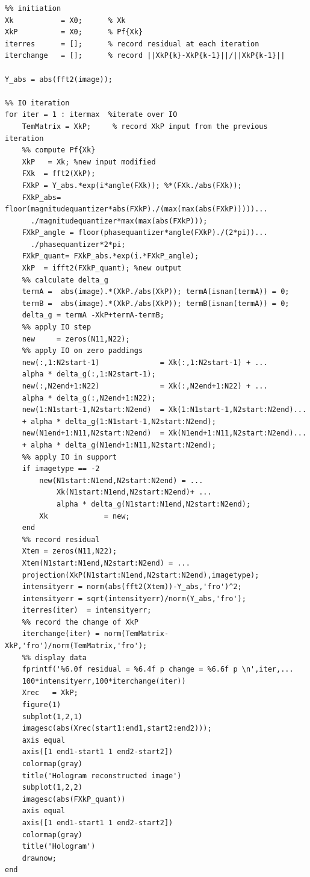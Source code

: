 \documentclass[letter,14pt]{extreport}
\begin{document}
\begin{appendices}
\begin{lstlisting}
%% initiation
Xk           = X0;      % Xk
XkP          = X0;      % Pf{Xk}
iterres      = [];      % record residual at each iteration
iterchange   = [];      % record ||XkP{k}-XkP{k-1}||/||XkP{k-1}||

Y_abs = abs(fft2(image));

%% IO iteration
for iter = 1 : itermax  %iterate over IO
    TemMatrix = XkP;     % record XkP input from the previous iteration
    %% compute Pf{Xk}
    XkP   = Xk; %new input modified
    FXk  = fft2(XkP);
    FXkP = Y_abs.*exp(i*angle(FXk)); %*(FXk./abs(FXk));
    FXkP_abs= floor(magnitudequantizer*abs(FXkP)./(max(max(abs(FXkP)))))...
      ./magnitudequantizer*max(max(abs(FXkP)));
    FXkP_angle = floor(phasequantizer*angle(FXkP)./(2*pi))...
      ./phasequantizer*2*pi;
    FXkP_quant= FXkP_abs.*exp(i.*FXkP_angle);
    XkP  = ifft2(FXkP_quant); %new output
    %% calculate delta_g
    termA =  abs(image).*(XkP./abs(XkP)); termA(isnan(termA)) = 0;
    termB =  abs(image).*(XkP./abs(XkP)); termB(isnan(termA)) = 0;
    delta_g = termA -XkP+termA-termB;
    %% apply IO step
    new     = zeros(N11,N22);
    %% apply IO on zero paddings
    new(:,1:N2start-1)              = Xk(:,1:N2start-1) + ...
    alpha * delta_g(:,1:N2start-1);
    new(:,N2end+1:N22)              = Xk(:,N2end+1:N22) + ...
    alpha * delta_g(:,N2end+1:N22);
    new(1:N1start-1,N2start:N2end)  = Xk(1:N1start-1,N2start:N2end)...
    + alpha * delta_g(1:N1start-1,N2start:N2end);
    new(N1end+1:N11,N2start:N2end)  = Xk(N1end+1:N11,N2start:N2end)...
    + alpha * delta_g(N1end+1:N11,N2start:N2end);
    %% apply IO in support
    if imagetype == -2
        new(N1start:N1end,N2start:N2end) = ...
            Xk(N1start:N1end,N2start:N2end)+ ...
            alpha * delta_g(N1start:N1end,N2start:N2end);
        Xk             = new;
    end
    %% record residual
    Xtem = zeros(N11,N22);
    Xtem(N1start:N1end,N2start:N2end) = ...
    projection(XkP(N1start:N1end,N2start:N2end),imagetype);
    intensityerr = norm(abs(fft2(Xtem))-Y_abs,'fro')^2;
    intensityerr = sqrt(intensityerr)/norm(Y_abs,'fro');
    iterres(iter)  = intensityerr;
    %% record the change of XkP
    iterchange(iter) = norm(TemMatrix-XkP,'fro')/norm(TemMatrix,'fro');
    %% display data
    fprintf('%6.0f residual = %6.4f p change = %6.6f p \n',iter,...
    100*intensityerr,100*iterchange(iter))
    Xrec   = XkP;
    figure(1)
    subplot(1,2,1)
    imagesc(abs(Xrec(start1:end1,start2:end2)));
    axis equal
    axis([1 end1-start1 1 end2-start2])
    colormap(gray)
    title('Hologram reconstructed image')
    subplot(1,2,2)
    imagesc(abs(FXkP_quant))
    axis equal
    axis([1 end1-start1 1 end2-start2])
    colormap(gray)
    title('Hologram')
    drawnow;
end


\end{lstlisting}
\end{appendices}
\end{document}
